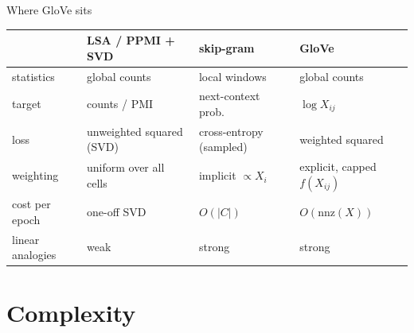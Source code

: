 \documentclass[aspectratio=169,11pt]{beamer}
\begin{document}
\begin{frame}{Where GloVe sits}
\small
\centering
\begin{tabular}{p{30mm}p{30mm}p{30mm}p{34mm}}
\toprule
 & \textbf{LSA / PPMI + SVD} & \textbf{skip-gram} & \textbf{GloVe}\\
\midrule
statistics & global counts & local windows & global counts\\
target & counts / PMI & next-context prob. & $\log X_{ij}$\\
loss & unweighted squared (SVD) & cross-entropy (sampled) & weighted squared\\
weighting & uniform over all cells & implicit $\propto X_i$ & explicit, capped $f(X_{ij})$\\
cost per epoch & one-off SVD & $O(|C|)$ & $O(\mathrm{nnz}(X))$\\
linear analogies & weak & strong & strong\\
\bottomrule
\end{tabular}

\vspace{5mm}
\end{frame}

\section{Complexity}
\end{document}
